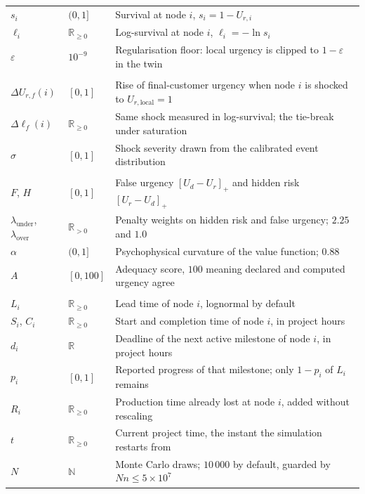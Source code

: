 \begin{table}[htbp]
\begin{tabularx}{\linewidth}{@{}l l X@{}}
$s_i$ & $(0,1]$ & Survival at node $i$, $s_i = 1 - U_{r,i}$ \\
$\ell_i$ & $\mathbb{R}_{\ge 0}$ & Log-survival at node $i$, $\ell_i = -\ln s_i$ \\
$\varepsilon$ & $10^{-9}$ & Regularisation floor: local urgency is clipped to $1-\varepsilon$ in the twin \\
\addlinespace
\multicolumn{3}{@{}l}{\textbf{\color{altenAzureDark}Criticality}} \\
$\Delta U_{r,f}(i)$ & $[0,1]$ & Rise of final-customer urgency when node $i$ is shocked to $U_{r,\text{local}}=1$ \\
$\Delta \ell_f(i)$ & $\mathbb{R}_{\ge 0}$ & Same shock measured in log-survival; the tie-break under saturation \\
$\sigma$ & $[0,1]$ & Shock severity drawn from the calibrated event distribution \\
\addlinespace
\multicolumn{3}{@{}l}{\textbf{\color{altenAzureDark}Cognitive adequacy}} \\
$F$, $H$ & $[0,1]$ & False urgency $[U_d - U_r]_+$ and hidden risk $[U_r - U_d]_+$ \\
$\lambda_{\text{under}}$, $\lambda_{\text{over}}$ & $\mathbb{R}_{>0}$ & Penalty weights on hidden risk and false urgency; $2.25$ and $1.0$ \\
$\alpha$ & $(0,1]$ & Psychophysical curvature of the value function; $0.88$ \\
$A$ & $[0,100]$ & Adequacy score, $100$ meaning declared and computed urgency agree \\
\addlinespace
\multicolumn{3}{@{}l}{\textbf{\color{altenAzureDark}Stochastic lead time}} \\
$L_i$ & $\mathbb{R}_{\ge 0}$ & Lead time of node $i$, lognormal by default \\
$S_i$, $C_i$ & $\mathbb{R}_{\ge 0}$ & Start and completion time of node $i$, in project hours \\
$d_i$ & $\mathbb{R}$ & Deadline of the next active milestone of node $i$, in project hours \\
$p_i$ & $[0,1]$ & Reported progress of that milestone; only $1-p_i$ of $L_i$ remains \\
$R_i$ & $\mathbb{R}_{\ge 0}$ & Production time already lost at node $i$, added without rescaling \\
$t$ & $\mathbb{R}_{\ge 0}$ & Current project time, the instant the simulation restarts from \\
$N$ & $\mathbb{N}$ & Monte Carlo draws; $10\,000$ by default, guarded by $N n \le 5 \times 10^{7}$ \\
\bottomrule
\end{tabularx}
\end{table}




